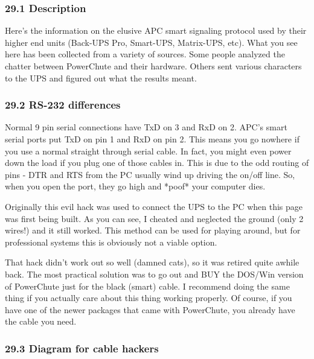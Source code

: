 \label{Description}

\subsubsection*{29.1 Description}

Here's the information on the elusive APC smart signaling protocol used by
their higher end units (Back-UPS Pro, Smart-UPS, Matrix-UPS, etc). What you
see here has been collected from a variety of sources. Some people analyzed
the chatter between PowerChute and their hardware. Others sent various
characters to the UPS and figured out what the results meant. 

\label{RS_002d232-differences}

\subsubsection*{29.2 RS-232 differences}

Normal 9 pin serial connections have TxD on 3 and RxD on 2. APC's smart serial
ports put TxD on pin 1 and RxD on pin 2. This means you go nowhere if you use
a normal straight through serial cable. In fact, you might even power down the
load if you plug one of those cables in. This is due to the odd routing of
pins - DTR and RTS from the PC usually wind up driving the on/off line. So,
when you open the port, they go high and *poof* your computer dies.  

Originally this evil hack was used to connect the UPS to the PC when this page
was first being built. As you can see, I cheated and neglected the ground
(only 2 wires!) and it still worked. This method can be used for playing
around, but for professional systems this is obviously not a viable option.  

That hack didn't work out so well (damned cats), so it was retired quite
awhile back. The most practical solution was to go out and BUY the DOS/Win
version of PowerChute just for the black (smart) cable. I recommend doing the
same thing if you actually care about this thing working properly. Of course,
if you have one of the newer packages that came with PowerChute, you already
have the cable you need. 

\label{Diagram-for-cable-hackers}

\subsubsection*{29.3 Diagram for cable hackers}

